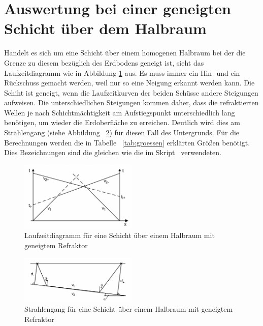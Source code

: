 \section{Auswertung bei einer geneigten Schicht über dem Halbraum}
\label{sec:geneigteSchicht}

Handelt es sich um eine Schicht über einem homogenen Halbraum bei der die Grenze zu diesem bezüglich des Erdbodens geneigt ist, sieht das Laufzeitdiagramm wie in Abbildung \ref{fig:genLauf} aus. Es muss immer ein Hin- und ein Rückschuss gemacht werden, weil nur so eine Neigung erkannt werden kann. Die Schiht ist geneigt, wenn die Laufzeitkurven der beiden Schüsse andere Steigungen aufweisen.
Die unterschiedlichen Steigungen kommen daher, dass die refraktierten Wellen je nach Schichtmächtigkeit am Aufstiegspunkt unterschiedlich lang benötigen, um wieder die Erdoberfläche zu erreichen. Deutlich wird dies am Strahlengang (siehe Abbildung~ \ref{fig:genStr}) für diesen Fall des Untergrunds. Für die Berechnungen werden die in Tabelle~ \ref{tab:groessen} erklärten Größen benötigt. Dies Bezeichnungen sind die gleichen wie die im Skript~ \cite{skript} verwendeten.

\begin{figure}[!ht]
 \centering
 \includegraphics[width=0.5\textwidth]{fig/geneigtLaufzeit}
 \caption[Laufzeitdiagramm für eine Schicht über einem Halbraum mit geneigtem Refraktor]{Laufzeitdiagramm für eine Schicht über einem Halbraum mit geneigtem Refraktor \cite{skript}}
 \label{fig:genLauf}
\end{figure}

\begin{figure}[!ht]
 \centering
 \includegraphics[width=0.5\textwidth]{fig/geneigtStrahlen}
 \caption[Strahlengang für eine Schicht über einem Halbraum mit geneigtem Refraktor]{Strahlengang für eine Schicht über einem Halbraum mit geneigtem Refraktor \cite{skript}}
 \label{fig:genStr}
\end{figure}

